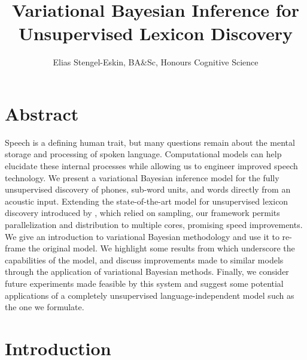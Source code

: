 \documentclass[12pt,letterpaper]{article}
\title{\vspace{-1.5cm} Variational Bayesian Inference for Unsupervised Lexicon Discovery}
\author{Elias Stengel-Eskin, BA\&Sc, Honours Cognitive Science}
\begin{document}
\maketitle

\section{Abstract}

Speech is a defining human trait, but many questions remain about the mental storage and processing of spoken language. Computational models can help elucidate these internal processes while allowing us to engineer improved speech technology. We present a variational Bayesian inference model for the fully unsupervised discovery of phones, sub-word units, and words directly from an acoustic input. Extending the state-of-the-art model for unsupervised lexicon discovery introduced by \citet{lee:2015}, which relied on sampling, our framework permits  parallelization and distribution to multiple cores, promising speed improvements. We give an introduction to variational Bayesian methodology and use it to re-frame the original model. We highlight some results from \citet{lee:2015} which underscore the capabilities of the model, and discuss improvements made to similar models through the application of variational Bayesian methods. Finally, we consider future experiments made feasible by this system and suggest some potential applications of a completely unsupervised language-independent model such as the one we formulate. 

\section{Introduction}
\end{document}

